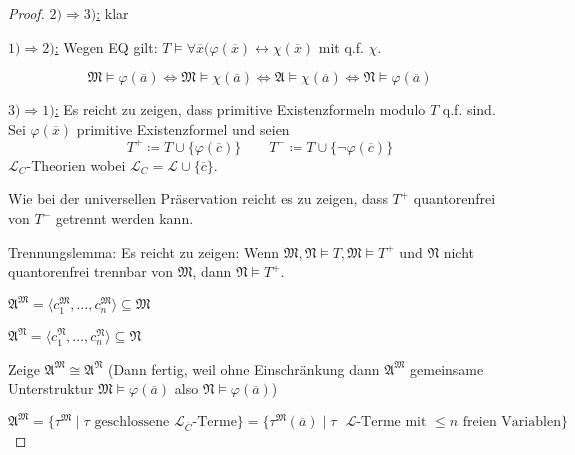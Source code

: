 \documentclass[12pt,parskip=full]{scrartcl}
\newcommand{\heading}{\underline}
\theoremstyle{definition}
\begin{document}
	\begin{proof}
		\heading{$2) \Rightarrow 3)$:} klar
		
		\heading{$1) \Rightarrow 2)$:} Wegen EQ gilt: $T \models \forall \overline{x}(\varphi(\overline{x}) \leftrightarrow \chi(\overline{x})$ mit q.f. $\chi$.
		
		\begin{equation*}
			\mathfrak{M} \models \varphi(\overline{a}) \Leftrightarrow \mathfrak{M} \models \chi(\overline{a}) \Leftrightarrow \mathfrak{A} \models \chi(\overline{a}) \Leftrightarrow \mathfrak{N} \models \varphi(\overline{a})
		\end{equation*}
		
		\heading{$3) \Rightarrow 1)$:} Es reicht zu zeigen, dass primitive Existenzformeln modulo $T$ q.f. sind. Sei $\varphi(\overline{x})$ primitive Existenzformel und seien
		\begin{equation*}
			T^+ \coloneqq T \cup \{ \varphi(\overline{c}) \} \qquad T^- \coloneqq T \cup \{ \lnot \varphi(\overline{c}) \}
		\end{equation*} $\mathcal{L}_C$-Theorien wobei $\mathcal{L}_C = \mathcal{L} \cup \{ \overline{c} \}$.
		
		Wie bei der universellen Präservation reicht es zu zeigen, dass $T^+$ quantorenfrei von $T^-$ getrennt werden kann.
		
		Trennungslemma: Es reicht zu zeigen: Wenn $\mathfrak{M}, \mathfrak{N} \models T, \mathfrak{M} \models T^+$ und $\mathfrak{N}$ nicht quantorenfrei trennbar von $\mathfrak{M}$, dann $\mathfrak{N} \models T^+$.
		
		$\mathfrak{A}^\mathfrak{M} = \langle c_1^\mathfrak{M}, \dots, c_n^\mathfrak{M} \rangle \subseteq \mathfrak{M}$
		
		$\mathfrak{A}^\mathfrak{N} = \langle c_1^\mathfrak{N}, \dots, c_n^\mathfrak{N} \rangle \subseteq \mathfrak{N}$
		
		Zeige $\mathfrak{A}^\mathfrak{M} \cong \mathfrak{A}^\mathfrak{N}$ (Dann fertig, weil ohne Einschränkung dann $\mathfrak{A}^\mathfrak{M}$ gemeinsame Unterstruktur $\mathfrak{M} \models \varphi(\overline{a})$ also $\mathfrak{N} \models \varphi(\overline{a})$)
		
		\begin{equation*}
			\mathfrak{A}^\mathfrak{M} = \{ \tau^\mathfrak{M} \mid \text{$\tau$ geschlossene $\mathcal{L}_{\overline{C}}$-Terme} \} = \{ \tau^\mathfrak{M}(\overline{a}) \mid \text{$\tau$ $\mathcal{L}$-Terme mit $\leq n$ freien Variablen} \}
		\end{equation*}
		

\end{proof}
\end{document}
